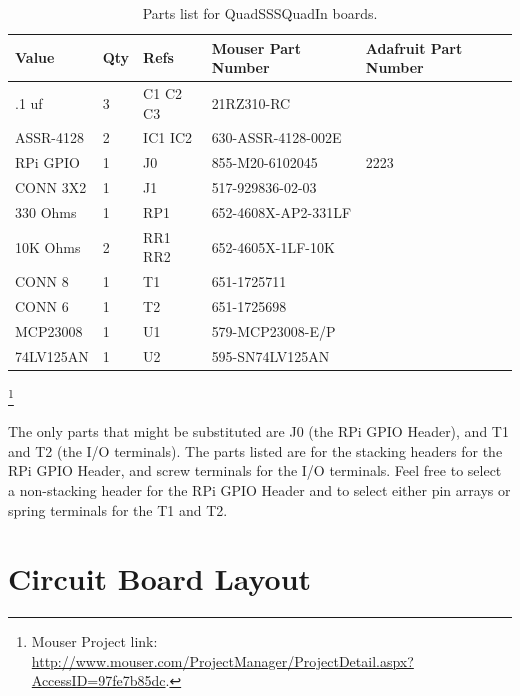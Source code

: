 \begin{table}[htdp]
\begin{centering}\begin{tabular}{|l|l|p{1in}|l|p{.5in}|}
\hline
Value&Qty&Refs&Mouser Part Number&Adafruit Part Number\\
\hline
.1 uf&3&C1 C2 C3&21RZ310-RC&\\
\hline
ASSR-4128&2&IC1 IC2&630-ASSR-4128-002E&\\
\hline
RPi GPIO&1&J0&855-M20-6102045&2223\\
\hline
CONN 3X2&1&J1&517-929836-02-03&\\
\hline
330 Ohms&1&RP1&652-4608X-AP2-331LF&\\
\hline
10K Ohms&2&RR1 RR2&652-4605X-1LF-10K&\\
\hline
CONN 8&1&T1&651-1725711&\\
\hline
CONN 6&1&T2&651-1725698&\\
\hline
MCP23008&1&U1&579-MCP23008-E/P&\\
\hline
74LV125AN&1&U2&595-SN74LV125AN&\\
\hline
\end{tabular}
\caption{Parts list for QuadSSSQuadIn boards.}
\end{centering}\end{table}\footnote{Mouser Project link: 
\url{http://www.mouser.com/ProjectManager/ProjectDetail.aspx?AccessID=97fe7b85dc}.}

The only parts that might be substituted are J0 (the RPi GPIO Header), and T1
and T2 (the I/O terminals). The parts listed are for the stacking headers for 
the RPi GPIO Header, and screw terminals for the I/O terminals.  Feel free to 
select a non-stacking header for the RPi GPIO Header and to select either pin 
arrays or spring terminals for the T1 and T2.                   

\section{Circuit Board Layout}

